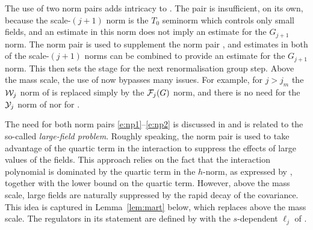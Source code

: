 The use of two norm pairs adds intricacy to \cite{BS-rg-IE,BS-rg-step}.
The pair  is insufficient, on its own, because the scale-$(j+1)$ norm
is the $T_0$ seminorm which controls only small fields, and an estimate in this norm
does not imply an estimate for the $G_{j+1}$ norm.  The norm pair  is
used to supplement the norm pair , and estimates in both of the scale-$(j+1)$
norms can be combined to provide an estimate for the $G_{j+1}$ norm.  This then
sets the stage for the next renormalisation group step.  Above the mass scale,
the use of  now bypasses many issues.  For example, for $j>j_m$
 the $\mathcal{W}_j$ norm of \cite[\eqref{step-e:9Kcalnorm}]{BS-rg-step} is replaced
 simply by the $\mathcal{F}_j(G)$ norm, and there is no need for the $\mathcal{Y}_j$ norm of
\cite[\eqref{step-e:Ycaldef}]{BS-rg-step} nor for \cite[Lemma~\ref{step-lem:KKK}]{BS-rg-step}.

The need for both norm pairs \eqref{e:np1}--\eqref{e:np2} is discussed in
\cite[Section~\ref{IE-sec:lfp}]{BS-rg-IE} and is related to the
so-called \emph{large-field problem}. Roughly speaking, the
norm pair  is used to take advantage of the quartic term in the interaction to
suppress the effects of large values of the fields. This approach
relies on the fact that the interaction polynomial is dominated by the
quartic term in the $h$-norm, as expressed by
\cite[\eqref{IE-e:tau2dom}]{BS-rg-IE}, together with the lower bound
\cite[\eqref{IE-e:epVbark0}]{BS-rg-IE} on the quartic term.
However, above the mass scale, large fields are naturally suppressed
by the rapid decay of the covariance.
This idea is captured in Lemma~\ref{lem:mart} below, which replaces
\cite[Lemma~\ref{IE-lem:mart}]{BS-rg-IE} above the mass scale.
The regulators in its statement are defined by  with the $s$-dependent
$\ell_j$ of .


